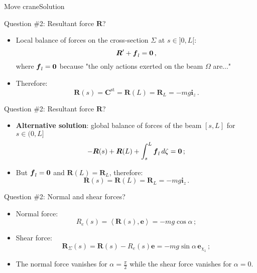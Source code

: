 \documentclass{beamer}
\newcommand{\id}{d}
\newcommand{\zj}{z}
\newcommand{\ej}{e}
\renewcommand{\ij}{i}
\newcommand{\ev}{{\boldsymbol\ej}}
\newcommand{\iv}{{\boldsymbol\ij}}
\newcommand{\medium}{\Omega}
\newcommand*{\xiu}{\chi_1}
\newcommand{\fj}{f}
\newcommand{\fv}{{\boldsymbol\fj}}
\newcommand{\Fresj}{R}
\newcommand{\Fres}{{\boldsymbol\Fresj}}
\newcommand{\bzero}{{\bf 0}}
\newcommand{\scal}[1]{\left\langle{#1}\right\rangle}
\begin{document}
\begin{frame}{Move crane}{Solution}

\begin{overprint}

\vskip-20pt
\begin{exampleblock}{Question \#2: Resultant force $\Fres$?}
\begin{itemize}
\item Local balance of forces on the cross-section $\Sigma$ at $s\in]0,L[$:
\begin{displaymath}
\Fres'+\fv_l=\bzero\,,
\end{displaymath}
where $\fv_l=\bzero$ because "the only actions exerted on the beam $\medium$ are..."
\item Therefore:
\begin{displaymath}
\Fres(s)={\boldsymbol C}^\text{st}=\Fres(L)=\Fres_L=-mg\iv_\zj\,.
\end{displaymath}
\end{itemize}
\end{exampleblock}

\vskip-20pt
\begin{exampleblock}{Question \#2: Resultant force $\Fres$?}
\begin{itemize}
\item {\bf Alternative solution}: global balance of forces of the beam $[s,L]$ for $s\in(0,L]$
\begin{displaymath}
-\Fres(s)+\Fres(L)+\int_s^L\fv_l\,\id\zeta=\bzero\,;
\end{displaymath}
\item But $\fv_l=\bzero$ and $\Fres(L)=\Fres_L$, therefore:
\begin{displaymath}
\Fres(s)=\Fres(L)=\Fres_L=-mg\iv_\zj\,.
\end{displaymath}
\end{itemize}
\end{exampleblock}

\vskip-20pt
\begin{exampleblock}{Question \#2: Normal and shear forces?}
\begin{itemize}
\item Normal force:
\begin{displaymath}
\Fresj_e(s)=\scal{\Fres(s),\ev}=-mg\cos\alpha\,;
\end{displaymath}
\item Shear force:
\begin{displaymath}
\Fres_\Sigma(s)=\Fres(s)-\Fresj_e(s)\ev=-mg\sin\alpha\, \ev_{\xiu}\,;
\end{displaymath}
\item The normal force vanishes for $\alpha=\frac{\pi}{2}$ while the shear force vanishes for $\alpha=0$.
\end{itemize}
\end{exampleblock}

\end{overprint}

\end{frame}
\end{document}
